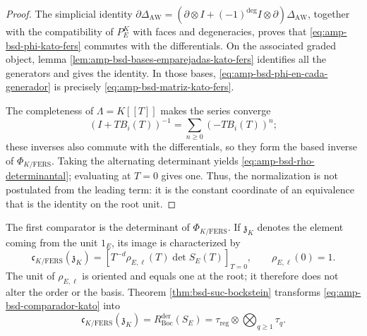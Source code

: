 \begin{proof}
The simplicial identity
\(\partial\Delta_{\mathrm{AW}}
=(\partial\otimes I+(-1)^{\deg}I\otimes\partial)
\Delta_{\mathrm{AW}}\), together with the compatibility of
\(P_E^K\) with faces and degeneracies, proves that
\eqref{eq:amp-bsd-phi-kato-fers} commutes with the differentials. On the associated
graded object, lemma
\ref{lem:amp-bsd-bases-emparejadas-kato-fers} identifies all the
generators and gives the identity. In those bases,
\eqref{eq:amp-bsd-phi-en-cada-generador} is precisely
\eqref{eq:amp-bsd-matriz-kato-fers}.

The completeness of \(\Lambda=K[[T]]\) makes the series converge
\begin{equation}\label{eq:amp-bsd-inversa-kato-fers}
 (I+TB_i(T))^{-1}
 =\sum_{n\geq0}(-TB_i(T))^n;
\end{equation}
these inverses also commute with the differentials, so they form the
based inverse of \(\Phi_{K/\mathrm{FERS}}\). Taking the alternating
determinant yields \eqref{eq:amp-bsd-rho-determinantal}; evaluating at
\(T=0\) gives one. Thus, the normalization is not postulated from the leading
term: it is the constant coordinate of an equivalence that is the identity
on the root unit.
\end{proof}

The first comparator is the determinant of
\(\Phi_{K/\mathrm{FERS}}\). If \(\mathfrak z_K\) denotes the element
coming from the unit \(1_E\), its image is characterized by
\begin{equation}\label{eq:amp-bsd-comparador-kato}
 \mathfrak c_{K/\mathrm{FERS}}(\mathfrak z_K)
 =\left[T^{-d}\rho_{E,\ell}(T)\det S_E(T)\right]_{T=0},
 \qquad
 \rho_{E,\ell}(0)=1.
\end{equation}
The unit of \(\rho_{E,\ell}\) is oriented and equals one at the root; it therefore does not
alter the order or the basis. Theorem
\ref{thm:bsd-suc-bockstein} transforms \eqref{eq:amp-bsd-comparador-kato} into
\begin{equation}\label{eq:amp-bsd-kato-bockstein}
 \mathfrak c_{K/\mathrm{FERS}}(\mathfrak z_K)
 =R_{\mathrm{Boc}}^{\mathrm{der}}(S_E)
 =\tau_{\mathrm{reg}}\otimes\bigotimes_{q\geq1}\tau_q.
\end{equation}

